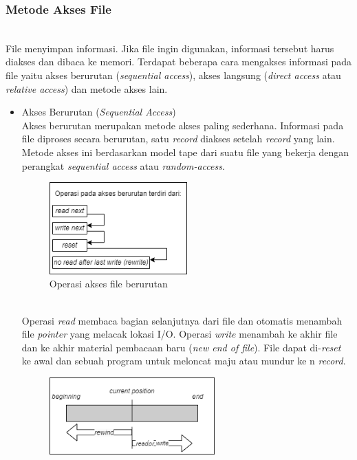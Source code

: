 \documentclass[12pt]{article}
\begin{document}
\subsubsection{Metode Akses File}
\\File menyimpan informasi. Jika file ingin digunakan, informasi tersebut harus diakses dan dibaca ke memori. Terdapat beberapa cara mengakses informasi pada file yaitu akses berurutan (\textit{sequential access}), akses langsung (\textit{direct access} atau \textit{relative access}) dan metode akses lain.
\begin{itemize}
    \item Akses Berurutan (\textit{Sequential Access})
        \\Akses berurutan merupakan metode akses paling sederhana. Informasi pada file diproses secara berurutan, satu \textit{record} diakses setelah \textit{record} yang lain. Metode akses ini berdasarkan model tape dari suatu file yang bekerja dengan perangkat \textit{sequential access} atau \textit{random-access}.
        \begin{figure}[h]
			\centering
			\includegraphics[width=0.5\textwidth]{asset/gambar1.png}
            \caption{Operasi akses file berurutan}
        \end{figure}
        \\Operasi \textit{read} membaca bagian selanjutnya dari file dan otomatis menambah file \textit{pointer} yang melacak lokasi I/O. Operasi \textit{write} menambah ke akhir file dan ke akhir material pembacaan baru (\textit{new end of file}). File dapat di-\textit{reset} ke awal dan sebuah program untuk meloncat maju atau mundur ke n \textit{record}.
        \begin{figure}[h]
			\centering
			\includegraphics[width=0.6\textwidth]{asset/gambar2.png}

\end{figure}
\end{itemize}
\end{document}
